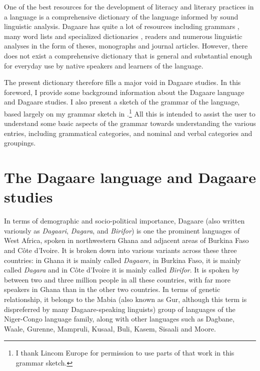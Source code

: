 \renewcommand{\thesection}{\arabic{section}}


One of the best resources for the development of literacy and literary practices in a language is a comprehensive dictionary of the language informed by sound linguistic analysis. Dagaare has quite a lot of resources including grammars \citep{Bodomo1997, Bodomo2000, Dakubu2005}, many word lists and specialized dictionaries \citep{Durand1953, Bodomo2004cantonese}, readers \citep{Zakpaa1978} and numerous linguistic analyses in the form of theses, monographs and journal articles. However, there does not exist a comprehensive dictionary that is general and substantial enough for everyday use by native speakers and learners of the language.

The present dictionary therefore fills a major void in Dagaare studies. In this foreword, I provide some background information about the Dagaare language and Dagaare studies. I also present a sketch of the grammar of the language, based largely on my grammar sketch in \citet{Bodomo2000}.\footnote{I thank Lincom Europe for permission to use parts of that work in this grammar sketch.} All this is intended to assist the user to understand some basic aspects of the grammar towards understanding the various entries, including grammatical categories, and nominal and verbal categories and groupings. 

\section{The Dagaare language and Dagaare studies}\label{sec:dagaarestudies}
In terms of demographic and socio-political importance, Dagaare (also written variously as \textit{Dagaari}, \textit{Dagara}, and \textit{Birifor}) is one the prominent languages of West Africa, spoken in northwestern Ghana and adjacent areas of Burkina Faso and C\^{o}te d’Ivoire. It is broken down into various variants across these three countries: in Ghana it is mainly called \textit{Dagaare}, in Burkina Faso, it is mainly called \textit{Dagara} and in C\^{o}te d’Ivoire it is mainly called \textit{Birifor}. It is spoken by between two and three million people in all these countries, with far more speakers in Ghana than in the other two countries.
In terms of genetic relationship, it belongs to the Mabia (also known as Gur, although this term is dispreferred by many Dagaare-speaking linguists) group of languages of the Niger-Congo language family, along with other languages such as Dagbane, Waale, Gurenne, Mampruli, Kusaal, Buli, Kasem, Sisaali and Moore.

